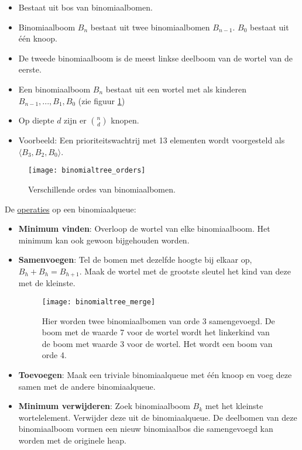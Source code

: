 		\begin{itemize}
			\item Bestaat uit bos van binomiaalbomen.
			\item Binomiaalboom $B_n$ bestaat uit twee binomiaalbomen $B_{n-1}$. $B_0$ bestaat uit één knoop.
			\item De tweede binomiaalboom is de meest linkse deelboom van de wortel van de eerste.
			\item Een binomiaalboom $B_n$ bestaat uit een wortel met als kinderen $B_{n-1}, ..., B_1, B_0$ (zie figuur \ref{fig:binomialtree_orders})
			\item Op diepte $d$ zijn er $\binom{n}{d}$ knopen.
			\item Voorbeeld: Een prioriteitswachtrij met 13 elementen wordt voorgesteld als $\langle B_3, B_2, B_0 \rangle$.
		\end{itemize}
		\begin{figure}[ht]
			\centering
			\texttt{[image: binomialtree\_orders]}
			\caption{Verschillende ordes van binomiaalbomen.}
			\label{fig:binomialtree_orders}
		\end{figure}

		De \underline{operaties} op een binomiaalqueue:
		\begin{itemize}
			\item \textbf{Minimum vinden}: Overloop de wortel van elke binomiaalboom. Het minimum kan ook gewoon bijgehouden worden.
			\item \textbf{Samenvoegen}: Tel de bomen met dezelfde hoogte bij elkaar op, $B_h + B_h = B_{h + 1}$. Maak de wortel met de grootste sleutel het kind van deze met de kleinste. 
			\begin{figure}[ht]
				\centering
				\texttt{[image: binomialtree\_merge]}
				\caption{Hier worden twee binomiaalbomen van orde 3 samengevoegd. De boom met de waarde 7 voor de wortel wordt het linkerkind van de boom met waarde 3 voor de wortel. Het wordt een boom van orde 4.}
				\label{fig:binomialtree_fig}
			\end{figure}
			\item \textbf{Toevoegen}: Maak een triviale binomiaalqueue met één knoop en voeg deze samen met de andere binomiaalqueue.
			\item \textbf{Minimum verwijderen}: Zoek binomiaalboom $B_k$ met het kleinste wortelelement. Verwijder deze uit de binomiaalqueue. De deelbomen van deze binomiaalboom vormen een nieuw binomiaalbos die samengevoegd kan worden met de originele heap.
		\end{itemize}

